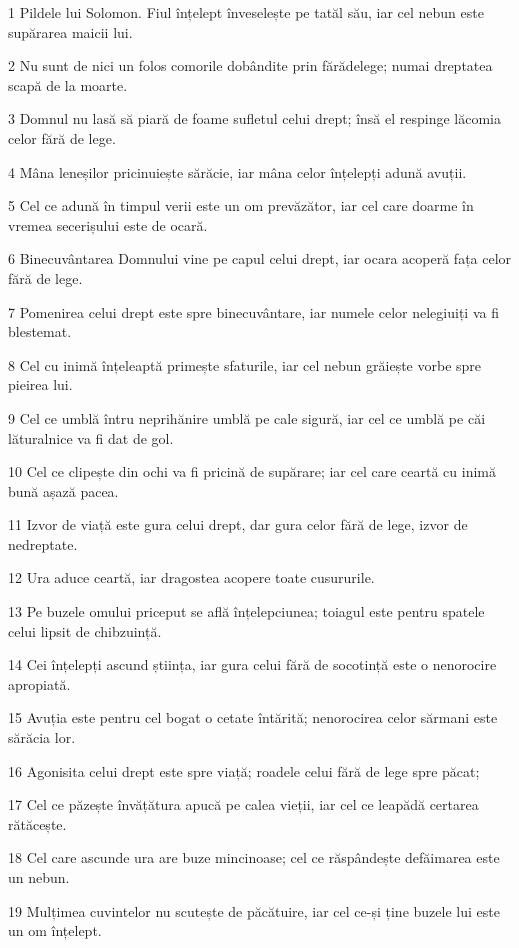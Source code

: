 \par 1 Pildele lui Solomon. Fiul înțelept înveselește pe tatăl său, iar cel nebun este supărarea maicii lui.
\par 2 Nu sunt de nici un folos comorile dobândite prin fărădelege; numai dreptatea scapă de la moarte.
\par 3 Domnul nu lasă să piară de foame sufletul celui drept; însă el respinge lăcomia celor fără de lege.
\par 4 Mâna leneșilor pricinuiește sărăcie, iar mâna celor înțelepți adună avuții.
\par 5 Cel ce adună în timpul verii este un om prevăzător, iar cel care doarme în vremea secerișului este de ocară.
\par 6 Binecuvântarea Domnului vine pe capul celui drept, iar ocara acoperă fața celor fără de lege.
\par 7 Pomenirea celui drept este spre binecuvântare, iar numele celor nelegiuiți va fi blestemat.
\par 8 Cel cu inimă înțeleaptă primește sfaturile, iar cel nebun grăiește vorbe spre pieirea lui.
\par 9 Cel ce umblă întru neprihănire umblă pe cale sigură, iar cel ce umblă pe căi lăturalnice va fi dat de gol.
\par 10 Cel ce clipește din ochi va fi pricină de supărare; iar cel care ceartă cu inimă bună așază pacea.
\par 11 Izvor de viață este gura celui drept, dar gura celor fără de lege, izvor de nedreptate.
\par 12 Ura aduce ceartă, iar dragostea acopere toate cusururile.
\par 13 Pe buzele omului priceput se află înțelepciunea; toiagul este pentru spatele celui lipsit de chibzuință.
\par 14 Cei înțelepți ascund știința, iar gura celui fără de socotință este o nenorocire apropiată.
\par 15 Avuția este pentru cel bogat o cetate întărită; nenorocirea celor sărmani este sărăcia lor.
\par 16 Agonisita celui drept este spre viață; roadele celui fără de lege spre păcat;
\par 17 Cel ce păzește învățătura apucă pe calea vieții, iar cel ce leapădă certarea rătăcește.
\par 18 Cel care ascunde ura are buze mincinoase; cel ce răspândește defăimarea este un nebun.
\par 19 Mulțimea cuvintelor nu scutește de păcătuire, iar cel ce-și ține buzele lui este un om înțelept.
